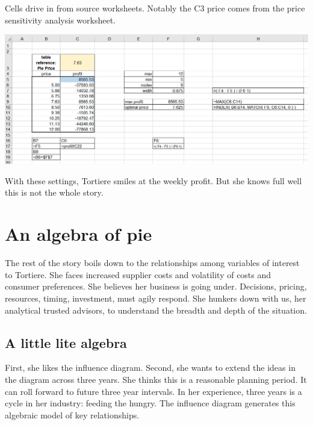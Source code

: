 \documentclass[
]{book}
\begin{document}
Cells drive in from source worksheets. Notably the C3 price comes from the price sensitivity analysis worksheet.

\includegraphics{images/02/pie-sensitivity-profit-result.jpg}

With these settings, Tortiere smiles at the weekly profit. But she knows full well this is not the whole story.

\hypertarget{an-algebra-of-pie}{%
\section{An algebra of pie}\label{an-algebra-of-pie}}

The rest of the story boils down to the relationships among variables of interest to Tortiere. She faces increased supplier costs and volatility of costs and consumer preferences. She believes her business is going under. Decisions, pricing, resources, timing, investment, must agily respond. She hunkers down with us, her analytical trusted advisors, to understand the breadth and depth of the situation.

\hypertarget{a-little-lite-algebra}{%
\subsection{A little lite algebra}\label{a-little-lite-algebra}}

First, she likes the influence diagram. Second, she wants to extend the ideas in the diagram across three years. She thinks this is a reasonable planning period. It can roll forward to future three year intervals. In her experience, three years is a cycle in her industry: feeding the hungry. The influence diagram generates this algebraic model of key relationships.
\end{document}
